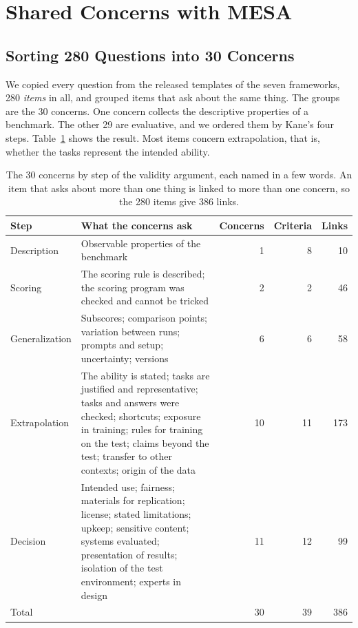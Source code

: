 \documentclass[runningheads]{llncs}
\begin{document}
\section{Shared Concerns with MESA}
\label{sec:mesa_standard}

\subsection{Sorting 280 Questions into 30 Concerns}
\label{sec:mapping_method}
We copied every question from the released templates of the seven frameworks, 280 \emph{items} in all, and grouped items that ask about the same thing. The groups are the 30 concerns. One concern collects the descriptive properties of a benchmark. The other 29 are evaluative, and we ordered them by Kane's four steps. Table~\ref{tab:coverage} shows the result. Most items concern extrapolation, that is, whether the tasks represent the intended ability.

\begin{table}[t]
\caption{The 30 concerns by step of the validity argument, each named in a few words. An item that asks about more than one thing is linked to more than one concern, so the 280 items give 386 links.}
\label{tab:coverage}
\centering
\footnotesize
\begin{tabularx}{\textwidth}{@{}>{\raggedright\arraybackslash}p{2.2cm}>{\raggedright\arraybackslash}Xrrr@{}}
\toprule
\textbf{Step} & \textbf{What the concerns ask} & \textbf{Concerns} & \textbf{Criteria} & \textbf{Links} \\
\midrule
Description & Observable properties of the benchmark & 1 & 8 & 10 \\
Scoring & The scoring rule is described; the scoring program was checked and cannot be tricked & 2 & 2 & 46 \\
Generalization & Subscores; comparison points; variation between runs; prompts and setup; uncertainty; versions & 6 & 6 & 58 \\
Extrapolation & The ability is stated; tasks are justified and representative; tasks and answers were checked; shortcuts; exposure in training; rules for training on the test; claims beyond the test; transfer to other contexts; origin of the data & 10 & 11 & 173 \\
Decision & Intended use; fairness; materials for replication; license; stated limitations; upkeep; sensitive content; systems evaluated; presentation of results; isolation of the test environment; experts in design & 11 & 12 & 99 \\
\midrule
Total & & 30 & 39 & 386 \\
\bottomrule
\end{tabularx}
\end{table}
\end{document}
